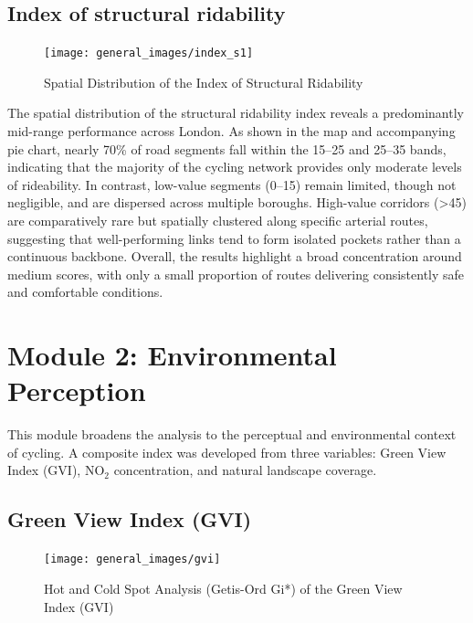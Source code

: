 \documentclass[
  12pt,
  oneside]{book}
\begin{document}
\subsection{Index of structural ridability}\label{index-of-structural-ridability}

\begin{figure}

{\centering \texttt{[image: general\_images/index\_s1]} 

}

\caption{Spatial Distribution of the Index of Structural Ridability}\label{fig:indexs1}
\end{figure}

The spatial distribution of the structural ridability index reveals a predominantly mid-range performance across London. As shown in the map and accompanying pie chart, nearly 70\% of road segments fall within the 15--25 and 25--35 bands, indicating that the majority of the cycling network provides only moderate levels of rideability. In contrast, low-value segments (0--15) remain limited, though not negligible, and are dispersed across multiple boroughs. High-value corridors (\textgreater45) are comparatively rare but spatially clustered along specific arterial routes, suggesting that well-performing links tend to form isolated pockets rather than a continuous backbone. Overall, the results highlight a broad concentration around medium scores, with only a small proportion of routes delivering consistently safe and comfortable conditions.

\section{Module 2: Environmental Perception}\label{module-2-environmental-perception}

This module broadens the analysis to the perceptual and environmental context of cycling. A composite index was developed from three variables: Green View Index (GVI), NO\(_2\) concentration, and natural landscape coverage.

\subsection{Green View Index (GVI)}\label{green-view-index-gvi}

\begin{figure}

{\centering \texttt{[image: general\_images/gvi]} 

}

\caption{Hot and Cold Spot Analysis (Getis-Ord Gi*) of the Green View Index (GVI)}\label{fig:gvi}
\end{figure}
\end{document}
